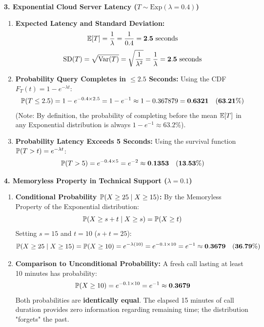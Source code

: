 \textbf{3. Exponential Cloud Server Latency ($T \sim \text{Exp}(\lambda = 0.4)$)}
\begin{enumerate}
    \item \textbf{Expected Latency and Standard Deviation:}
    $$\E[T] = \frac{1}{\lambda} = \frac{1}{0.4} = \mathbf{2.5 \text{ seconds}}$$
    $$\SD(T) = \sqrt{\Var(T)} = \sqrt{\frac{1}{\lambda^2}} = \frac{1}{\lambda} = \mathbf{2.5 \text{ seconds}}$$
    \item \textbf{Probability Query Completes in $\le 2.5$ Seconds:}
    Using the CDF $F_T(t) = 1 - e^{-\lambda t}$:
    $$\P(T \le 2.5) = 1 - e^{-0.4 \times 2.5} = 1 - e^{-1} \approx 1 - 0.367879 = \mathbf{0.6321 \quad (63.21\%)}$$
    (Note: By definition, the probability of completing before the mean $\E[T]$ in any Exponential distribution is always $1 - e^{-1} \approx 63.2\%$).
    \item \textbf{Probability Latency Exceeds 5 Seconds:}
    Using the survival function $\P(T > t) = e^{-\lambda t}$:
    $$\P(T > 5) = e^{-0.4 \times 5} = e^{-2} \approx \mathbf{0.1353 \quad (13.53\%)}$$
\end{enumerate}

\textbf{4. Memoryless Property in Technical Support ($\lambda = 0.1$)}
\begin{enumerate}
    \item \textbf{Conditional Probability $\P(X \ge 25 \mid X \ge 15)$:}
    By the Memoryless Property of the Exponential distribution:
    $$\P(X \ge s + t \mid X \ge s) = \P(X \ge t)$$
    Setting $s = 15$ and $t = 10$ ($s + t = 25$):
    $$\P(X \ge 25 \mid X \ge 15) = \P(X \ge 10) = e^{-\lambda (10)} = e^{-0.1 \times 10} = e^{-1} \approx \mathbf{0.3679 \quad (36.79\%)}$$
    \item \textbf{Comparison to Unconditional Probability:}
    A fresh call lasting at least 10 minutes has probability:
    $$\P(X \ge 10) = e^{-0.1 \times 10} = e^{-1} \approx \mathbf{0.3679}$$
    Both probabilities are \textbf{identically equal}. The elapsed 15 minutes of call duration provides zero information regarding remaining time; the distribution "forgets" the past.
\end{enumerate}

